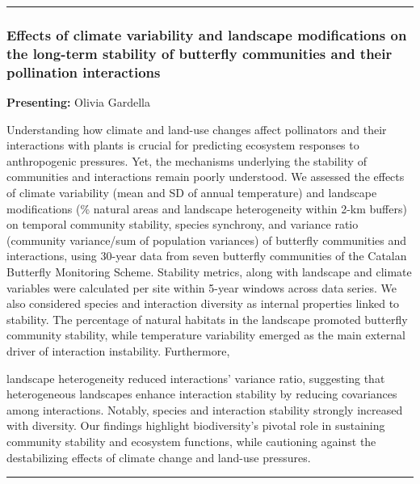 \documentclass[
  letterpaper,
  DIV=11,
  numbers=noendperiod]{scrartcl}
\begin{document}
\begin{center}\rule{0.5\linewidth}{0.5pt}\end{center}

\subsubsection{Effects of climate variability and landscape
modifications on the long-term stability of butterfly communities and
their pollination
interactions}\label{effects-of-climate-variability-and-landscape-modifications-on-the-long-term-stability-of-butterfly-communities-and-their-pollination-interactions}

\textbf{Presenting:} Olivia Gardella

Understanding how climate and land-use changes affect pollinators and
their interactions with plants is crucial for predicting ecosystem
responses to anthropogenic pressures. Yet, the mechanisms underlying the
stability of communities and interactions remain poorly understood. We
assessed the effects of climate variability (mean and SD of annual
temperature) and landscape modifications (\% natural areas and landscape
heterogeneity within 2-km buffers) on temporal community stability,
species synchrony, and variance ratio (community variance/sum of
population variances) of butterfly communities and interactions, using
30-year data from seven butterfly communities of the Catalan Butterfly
Monitoring Scheme. Stability metrics, along with landscape and climate
variables were calculated per site within 5-year windows across data
series. We also considered species and interaction diversity as internal
properties linked to stability. The percentage of natural habitats in
the landscape promoted butterfly community stability, while temperature
variability emerged as the main external driver of interaction
instability. Furthermore,

landscape heterogeneity reduced interactions' variance ratio, suggesting
that heterogeneous landscapes enhance interaction stability by reducing
covariances among interactions. Notably, species and interaction
stability strongly increased with diversity. Our findings highlight
biodiversity's pivotal role in sustaining community stability and
ecosystem functions, while cautioning against the destabilizing effects
of climate change and land-use pressures.

\begin{center}\rule{0.5\linewidth}{0.5pt}\end{center}
\end{document}
